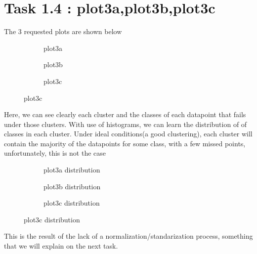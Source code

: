 \documentclass[12pt]{article}
\begin{document}
	 \section*{Task 1.4 : plot3a,plot3b,plot3c}
		The 3 requested plots are shown below
		 \begin{figure}[H]
		 	\centering
		 	\begin{subfigure}{0.4\textwidth}
		 		\caption{plot3a}
		 		\label{fig:first}
		 	\end{subfigure}
		 	\hfill
		 	\begin{subfigure}{0.4\textwidth}
		 		\caption{plot3b}
		 		\label{fig:second}
		 	\end{subfigure}
		 	\hfill
		 	\begin{subfigure}{0.4\textwidth}
		 		\caption{plot3c}
		 		\label{fig:third}
		 	\end{subfigure}
		 	
		 	\label{fig:figures}
		 \end{figure}
		Here, we can see clearly each cluster and the classes of each datapoint that fails under those clusters. With use of histograms, we can learn the distribution of of classes in each cluster. Under ideal conditions(a good clustering), each cluster will contain the majority of the datapoints for some class, with a few missed points, unfortunately, this is not the case
		\begin{figure}[H]
			\centering
			\begin{subfigure}{0.4\textwidth}
				\caption{plot3a distribution}
				\label{fig:first}
			\end{subfigure}
			\hfill
			\begin{subfigure}{0.4\textwidth}
				\caption{plot3b distribution}
				\label{fig:second}
			\end{subfigure}
			\hfill
			\begin{subfigure}{0.4\textwidth}
				\caption{plot3c distribution}
				\label{fig:third}
			\end{subfigure}
			
			\label{fig:figures}
		\end{figure}
		 This is the result of the lack of a normalization/standarization process, something that we will explain on the next task.
		 
\end{document}
